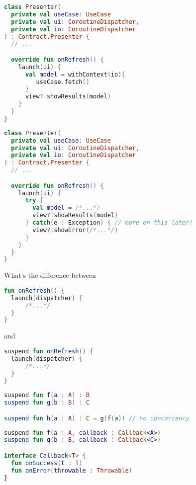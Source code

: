 \documentclass[10pt]{beamer}
\begin{document}
\begin{frame}[fragile]
\begin{lstlisting}[language=Kotlin, basicstyle=\ttfamily]
class Presenter(
  private val useCase: UseCase
  private val ui: CoroutineDispatcher,
  private val io: CoroutineDispatcher
) : Contract.Presenter {
  // ...

  override fun onRefresh() {
    launch(ui) {
      val model = withContext(io){
         useCase.fetch()
      }
      view?.showResults(model)
    }
  }
}
\end{lstlisting}
\end{frame}

\begin{frame}[fragile]
\begin{lstlisting}[language=Kotlin, basicstyle=\ttfamily]
class Presenter(
  private val useCase: UseCase
  private val ui: CoroutineDispatcher,
  private val io: CoroutineDispatcher
) : Contract.Presenter {
  // ...

  override fun onRefresh() {
    launch(ui) { 
      try {
        val model = /*...*/
        view?.showResults(model)
      } catch(e : Exception) { // more on this later!
        view?.showError(/*...*/)
      }
    }
  }
}
\end{lstlisting}
\end{frame}

\begin{frame}[fragile]
What's the difference between 
\begin{lstlisting}[language=Kotlin, basicstyle=\ttfamily]
fun onRefresh() { 
  launch(dispatcher) { 
      /*...*/
  }
}
\end{lstlisting}
and
\begin{lstlisting}[language=Kotlin, basicstyle=\ttfamily]
suspend fun onRefresh() { 
  launch(dispatcher) { 
      /*...*/
  }
}
\end{lstlisting}
\end{frame}


\begin{frame}[fragile]
\begin{lstlisting}[language=Kotlin, basicstyle=\ttfamily]
suspend fun f(a : A) : B 
suspend fun g(b : B) : C 

suspend fun h(a : A) : C = g(f(a)) // no concurrency
\end{lstlisting}
\end{frame}
\begin{frame}[fragile]
\begin{lstlisting}[language=Kotlin, basicstyle=\ttfamily]
suspend fun f(a : A, callback : Callback<A>)
suspend fun g(b : B, callback : Callback<C>) 

interface Callback<T> {
  fun onSuccess(t : T)
  fun onError(throwable : Throwable) 
}
\end{lstlisting}
\end{frame}
\end{document}
